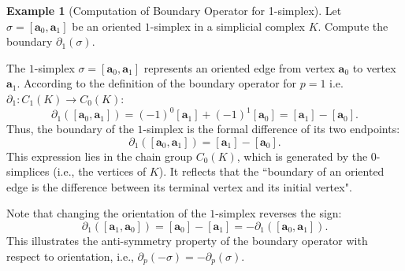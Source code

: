 \documentclass[12pt,oneside,reqno]{amsart}
\theoremstyle{plain}
\theoremstyle{definition}
\newtheorem{example}{Example}[section]
\theoremstyle{remark}
\newcommand{\0}{{\textbf{0}}}
\begin{document}
\begin{example}[Computation of Boundary Operator for 1-simplex]\label{eq:Computation of Boundary Operator for 1 simplex}
Let $\sigma = [\mathbf{a}_0, \mathbf{a}_1]$ be an oriented $1$-simplex in a simplicial complex $K$. Compute the boundary $\partial_1(\sigma)$.

The $1$-simplex $\sigma = [\mathbf{a}_0, \mathbf{a}_1]$ represents an oriented edge from vertex $\mathbf{a}_0$ to vertex $\mathbf{a}_1$. According to the definition of the boundary operator for $p = 1$ i.e. $\partial_1 \colon C_{1}(K) \to C_{0}(K)$:
\[
\partial_1([\mathbf{a}_0, \mathbf{a}_1]) = (-1)^0 [\mathbf{a}_1] + (-1)^1 [\mathbf{a}_0] = [\mathbf{a}_1] - [\mathbf{a}_0].
\]
Thus, the boundary of the $1$-simplex is the formal difference of its two endpoints:
\[
\partial_1([\mathbf{a}_0, \mathbf{a}_1]) = [\mathbf{a}_1] - [\mathbf{a}_0].
\]
This expression lies in the chain group $C_0(K)$, which is generated by the $0$-simplices (i.e., the vertices of $K$). It reflects that the ``boundary of an oriented edge is the difference between its terminal vertex and its initial vertex".

Note that changing the orientation of the $1$-simplex reverses the sign:
\[
\partial_1([\mathbf{a}_1, \mathbf{a}_0]) = [\mathbf{a}_0] - [\mathbf{a}_1] = -\partial_1([\mathbf{a}_0, \mathbf{a}_1]).
\]
This illustrates the anti-symmetry property of the boundary operator with respect to orientation, i.e., $\partial_p(-\sigma) = -\partial_p(\sigma)$.    
\end{example}
\end{document}
